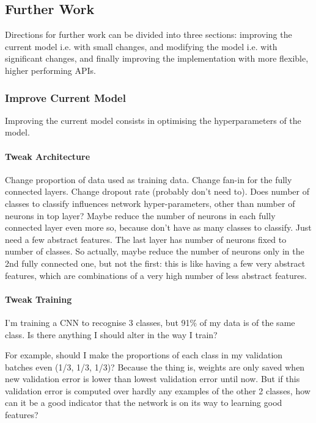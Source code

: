 \documentclass[a4paper,11pt]{article}
\begin{document}
\subsection{Further Work}

Directions for further work can be divided into three sections: improving the current model i.e. with small changes, and modifying the model i.e. with significant changes, and finally improving the implementation with more flexible, higher performing APIs.

\subsubsection{Improve Current Model}

Improving the current model consists in optimising the hyperparameters of the model.

\paragraph{Tweak Architecture}

Change proportion of data used as training data.
Change fan-in for the fully connected layers.
Change dropout rate (probably don't need to).
Does number of classes to classify influences network hyper-parameters, other than number of neurons in top layer?
Maybe reduce the number of neurons in each fully connected layer even more so, because don't have as many classes to classify. Just need a few abstract features. The last layer has number of neurons fixed to number of classes. So actually, maybe reduce the number of neurons only in the 2nd fully connected one, but not the first: this is like having a few very abstract features, which are combinations of a very high number of less abstract features.

\paragraph{Tweak Training}

I'm training a CNN to recognise 3 classes, but 91\% of my data is of the same class. Is there anything I should alter in the way I train?

For example, should I make the proportions of each class in my validation batches even (1/3, 1/3, 1/3)? Because the thing is, weights are only saved when new validation error is lower than lowest validation error until now. But if this validation error is computed over hardly any examples of the other 2 classes, how can it be a good indicator that the network is on its way to learning good features?﻿\\
\end{document}
